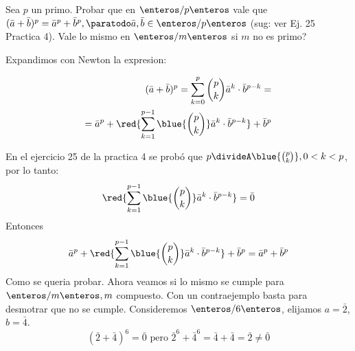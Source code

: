 \begin{enunciado}{\ejercicio}
Sea $p$ un primo. Probar que en $\enteros/p\enteros$ vale que $(\bar{a} + \bar{b})^p = \bar{a}^p + \bar{b}^p, \paratodo \bar{a}, \bar{b} \in \enteros/p\enteros$
(sug: ver Ej. 25 Practica 4). Vale lo mismo en $\enteros/m\enteros$ si $m$ no es primo?
\end{enunciado}

Expandimos con Newton la expresion: 

\begin{align}
(\bar{a} + \bar{b})^p = \sum_{k=0}^p \binom{p}{k} \bar{a}^{k} \cdot \bar{b}^{p-k} = \\
= \bar{a}^p + \red{\sum_{k=1}^{p - 1} \blue{\binom{p}{k}} \bar{a}^{k} \cdot \bar{b}^{p-k}} + \bar{b}^p
\end{align}

En el ejercicio 25 de la practica 4 se probó que $p \divideA \blue{\binom{p}{k}}, 0 < k < p$, por lo tanto:
$$
\red{\sum_{k=1}^{p - 1} \blue{\binom{p}{k}} \bar{a}^{k} \cdot \bar{b}^{p-k}} = \bar{0}
$$
Entonces 
$$
 \bar{a}^p + \red{\sum_{k=1}^{p - 1} \blue{\binom{p}{k}} \bar{a}^{k} \cdot \bar{b}^{p-k}} + \bar{b}^p = \bar{a}^p + \bar{b}^p
$$
Como se queria probar.
Ahora veamos si lo mismo se cumple para $\enteros/m\enteros, m$ compuesto. Con un contraejemplo basta para desmotrar que no se cumple. 
Consideremos $\enteros/6\enteros$, elijamos $a = \bar{2}$, $b = \bar{4}$. 
$$
(\bar{2} + \bar{4})^6 = \bar{0} \text{ pero } \bar{2}^6 + \bar{4}^6 = \bar{4} + \bar{4} = \bar{2} \neq \bar{0}
$$

\begin{aportes}
    \item {}
\end{aportes}
